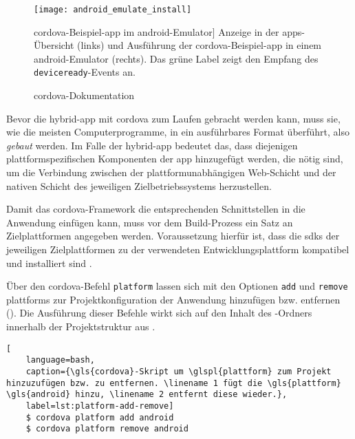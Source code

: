 {\begin{figure}[h!]
\centering
\texttt{[image: android\_emulate\_install]}
	\caption
	[\gls{cordova}-Beispiel-\gls{app} im \gls{android}-Emulator]
	{Anzeige in der \glspl{app}-Übersicht (links) und Ausführung der \gls{cordova}-Beispiel-\gls{app} in einem \gls{android}-Emulator (rechts). Das grüne Label zeigt den Empfang des \lstinline|deviceready|-Events an.}
	\label{fig:android_emulate_install}
		\imagesourcefont
		\vspace{\imagesourcespace}
		\imagesourcefont{}
		\caption*{\imagesourcelabel \gls{cordova}-Dokumentation \cite{android_emulate_install.png}}
\end{figure}


Bevor die \gls{hybrid-app} mit \gls{cordova} zum Laufen gebracht werden kann, muss sie, wie die meisten Computerprogramme, in ein ausführbares Format überführt, also \emph{gebaut} werden.
Im Falle der \gls{hybrid-app} bedeutet das, dass diejenigen plattformspezifischen Komponenten der \gls{app} hinzugefügt werden, die nötig sind, um die Verbindung zwischen der plattformunabhängigen Web-Schicht und der nativen Schicht des jeweiligen Zielbetriebssystems herzustellen.

Damit das \gls{cordova}-Framework die entsprechenden Schnittstellen in die Anwendung einfügen kann, muss vor dem Build-Prozess ein Satz an Zielplattformen angegeben werden. 
Voraussetzung hierfür ist, dass die \glspl{sdk} der jeweiligen Zielplattformen zu der verwendeten Entwicklungsplattform kompatibel und installiert sind \cite{Cordova-Docs_CLI}.

Über den \gls{cordova}-Befehl \lstinline|platform| lassen sich mit den Optionen \lstinline|add| und \lstinline|remove| \glspl{plattform} zur Projektkonfiguration der Anwendung hinzufügen bzw. entfernen ().
Die Ausführung dieser Befehle wirkt sich auf den Inhalt des -Ordners innerhalb der Projektstruktur aus \cite{Cordova-Docs_CLI}.

\par\noindent\begin{minipage}{\linewidth}
\begin{lstlisting}[
	language=bash,
	caption={\gls{cordova}-Skript um \glspl{plattform} zum Projekt hinzuzufügen bzw. zu entfernen. \linename 1 fügt die \gls{plattform} \gls{android} hinzu, \linename 2 entfernt diese wieder.},
	label=lst:platform-add-remove]
	$ cordova platform add android
	$ cordova platform remove android
\end{lstlisting}
\end{minipage}\par\addvspace{\topskip}

}
